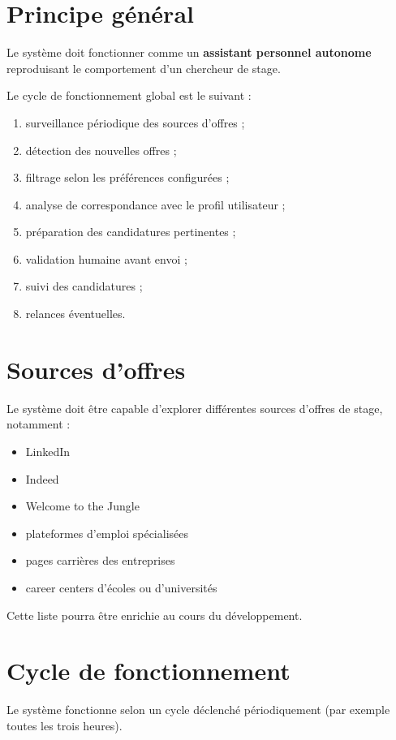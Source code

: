 \documentclass[11pt,a4paper]{article}
\begin{document}
\section{Principe général}

Le système doit fonctionner comme un \textbf{assistant personnel autonome} reproduisant le comportement d’un chercheur de stage.

Le cycle de fonctionnement global est le suivant :

\begin{enumerate}
\item surveillance périodique des sources d'offres ;
\item détection des nouvelles offres ;
\item filtrage selon les préférences configurées ;
\item analyse de correspondance avec le profil utilisateur ;
\item préparation des candidatures pertinentes ;
\item validation humaine avant envoi ;
\item suivi des candidatures ;
\item relances éventuelles.
\end{enumerate}

\section{Sources d’offres}

Le système doit être capable d’explorer différentes sources d’offres de stage, notamment :

\begin{itemize}
\item LinkedIn
\item Indeed
\item Welcome to the Jungle
\item plateformes d’emploi spécialisées
\item pages carrières des entreprises
\item career centers d’écoles ou d’universités
\end{itemize}

Cette liste pourra être enrichie au cours du développement.

\section{Cycle de fonctionnement}

Le système fonctionne selon un cycle déclenché périodiquement (par exemple toutes les trois heures).
\end{document}
